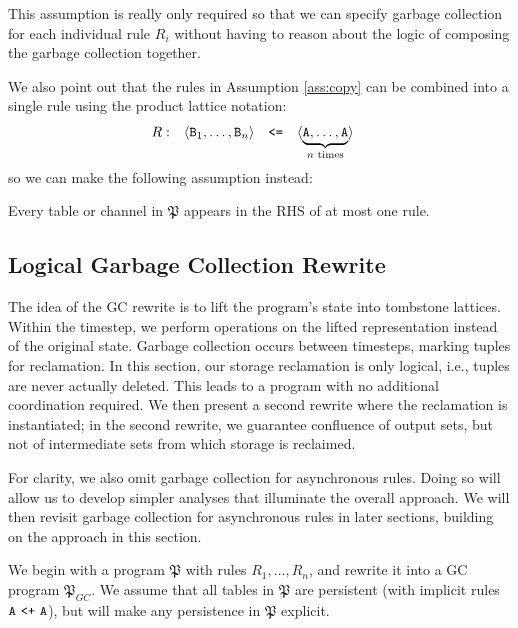 This assumption is really only required so that we can specify garbage collection for each individual rule $R_i$ without having to reason about the logic of composing the garbage collection together.

We also point out that the rules in Assumption \ref{ass:copy} can be combined into a single rule using the product lattice notation:
\begin{align*}
R: && \langle \tt{B}_1, \dots, \tt{B}_n \rangle &\quad\tt{<=}\quad \langle \underbrace{\tt{A}, \dots, \tt{A}}_{\text{$n$ times}} \rangle
\end{align*}
so we can make the following assumption instead:
\begin{assumption}
\label{ass:single_rule}
Every table or channel in $\mathfrak{P}$ appears in the RHS of at most one rule.
\end{assumption}


\subsection{Logical Garbage Collection Rewrite}
The idea of the GC rewrite is to lift the program's state into tombstone lattices.
Within the timestep, we perform operations on the lifted representation instead of the original state.
Garbage collection occurs between timesteps, marking tuples for reclamation.
In this section, our storage reclamation is only logical, i.e., tuples are never actually deleted.
This leads to a program with no additional coordination required.
We then present a second rewrite where the reclamation is instantiated; in the second rewrite, we guarantee confluence of output sets, but not of intermediate sets from which storage is reclaimed.

For clarity, we also omit garbage collection for asynchronous rules.
Doing so will allow us to develop simpler analyses that illuminate the overall approach.
We will then revisit garbage collection for asynchronous rules in later sections, building on the approach in this section.

We begin with a program $\mathfrak{P}$ with rules $R_1, \dots, R_n$, and rewrite it into a GC program $\mathfrak{P}_{GC}$.
We assume that all tables in $\mathfrak{P}$ are persistent (with implicit rules $\tt{A} ~\tt{<+}~ \tt{A}$), but will make any persistence in $\mathfrak{P}$ explicit.



